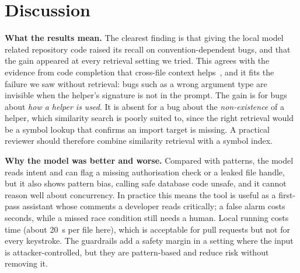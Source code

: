 \documentclass[12pt,onecolumn,draftclsnofoot]{IEEEtran}
\begin{document}
\section{Discussion}\label{sec:discussion}
\textbf{What the results mean.} The clearest finding is that giving the local model related repository code raised its recall on convention-dependent bugs, and that the gain appeared at every retrieval setting we tried. This agrees with the evidence from code completion that cross-file context helps~\cite{zhang2023repocoder,ding2023crosscodeeval}, and it fits the failure we saw without retrieval: bugs such as a wrong argument type are invisible when the helper's signature is not in the prompt. The gain is for bugs about \emph{how a helper is used}. It is absent for a bug about the \emph{non-existence} of a helper, which similarity search is poorly suited to, since the right retrieval would be a symbol lookup that confirms an import target is missing. A practical reviewer should therefore combine similarity retrieval with a symbol index.

\textbf{Why the model was better and worse.} Compared with patterns, the model reads intent and can flag a missing authorisation check or a leaked file handle, but it also shows pattern bias, calling safe database code unsafe, and it cannot reason well about concurrency. In practice this means the tool is useful as a first-pass assistant whose comments a developer reads critically; a false alarm costs seconds, while a missed race condition still needs a human. Local running costs time (about 20~s per file here), which is acceptable for pull requests but not for every keystroke. The guardrails add a safety margin in a setting where the input is attacker-controlled, but they are pattern-based and reduce risk without removing it.
\end{document}
